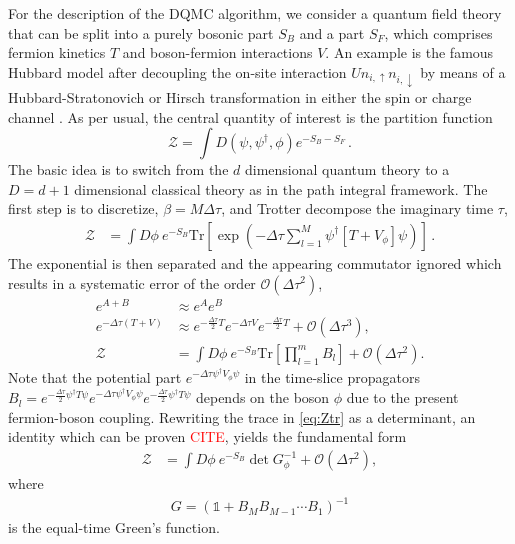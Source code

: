 \documentclass[%
 reprint,
superscriptaddress,
citeautoscript,
showpacs,
 amsmath,amssymb,
 aps,
 prb,
longbibliography,
]{revtex4-1}
\begin{document}
For the description of the DQMC algorithm\cite{Blankenbecler1981}, we consider a quantum field theory that can be split into a purely bosonic part $S_B$ and a part $S_F$, which comprises fermion kinetics $T$ and boson-fermion interactions $V$. An example is the famous Hubbard model after decoupling the on-site
interaction $U n_{i, \uparrow} n_{i, \downarrow}$ by means of a Hubbard-Stratonovich or Hirsch transformation in either the spin or charge channel \cite{Hirsch1983}. As per usual, the central quantity of interest is the partition function
%
\begin{equation}
\mathcal{Z} = \int D\left( \psi, \psi^\dagger, \phi \right) e^{-S_B - S_F} \,.
\end{equation}
%
The basic idea is to switch from the $d$ dimensional quantum theory to a $D = d + 1$ dimensional classical theory as in the path integral framework. The first step is to discretize, $\beta = M \Delta \tau$, and Trotter decompose the imaginary time $\tau$,
%
\begin{align}
	\mathcal{Z} &= \int D\phi \ e^{-S_B} \mathrm{Tr}{\left[\exp{\left( -\Delta\tau \sum_{l=1}^M \psi^\dagger \left[T + V_\phi\right] \psi \right)}\right]} \label{eq:discretizedpi} \,.
\end{align}
%
The exponential is then separated and the appearing commutator ignored which results in a systematic error of the order $\mathcal{O}\left(\Delta\tau^2\right)$,
\begin{align}
	e^{A + B} &\approx e^A e^B \quad \nonumber\\
	e^{-\Delta\tau (T + V)} &\approx e^{- \frac{\Delta\tau}{2}T} e^{-\Delta\tau V} e^{- \frac{\Delta\tau}{2}T} + \mathcal{O}\left(\Delta\tau^3\right), \nonumber\\
	\mathcal{Z} &= \int D\phi \ e^{-S_B} \mathrm{Tr}{\left[ \prod_{l=1}^{m} B_l \right]} + \mathcal{O}\left(\Delta\tau^2\right). \label{eq:Ztr}
\end{align}
%
Note that the potential part $e^{-\Delta\tau \psi^\dagger V_\phi \psi}$ in the time-slice propagators $B_l = e^{- \frac{\Delta\tau}{2}\psi^\dagger T \psi} e^{-\Delta\tau \psi^\dagger V_\phi \psi} e^{- \frac{\Delta\tau}{2}\psi^\dagger T \psi}$ depends on the boson $\phi$ due to the present fermion-boson coupling. Rewriting the trace in \eqref{eq:Ztr} as a determinant, an identity which can be proven \textcolor{red}{CITE}, yields the fundamental form
%
\begin{align}
	\mathcal{Z} &= \int D\phi \ e^{-S_B} \det{G_\phi^{-1}} + \mathcal{O}\left(\Delta\tau^2\right), \label{eq:DQMC}
\end{align}
%
where
\begin{align}
	G = \left( \mathbb{1} + B_M B_{M-1} \cdots B_1 \right)^{-1} \label{etgf}
\end{align}
is the equal-time Green's function.
\end{document}
